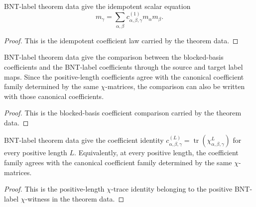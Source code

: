 \begin{theorem}%
    \label{thm:mpdo_bnt_label_theorem_data_idempotent_eq_sum}
    \leanok
    BNT-label theorem data give the idempotent scalar equation
    \[
        m_\gamma =
        \sum_{\alpha,\beta}
        c^{(1)}_{\alpha,\beta,\gamma}m_\alpha m_\beta.
    \]
\end{theorem}
\begin{proof}\leanok
    This is the idempotent coefficient law carried by the theorem data.
\end{proof}

\begin{theorem}%
    \label{thm:mpdo_bnt_label_theorem_data_blocked_coeff_eq}
    \leanok
    BNT-label theorem data give the comparison between the blocked-basis
    coefficients and the BNT-label coefficients through the source and target
    label maps. Since the positive-length coefficients agree with the
    canonical coefficient family determined by the same $\chi$-matrices, the
    comparison can also be written with those canonical coefficients.
\end{theorem}
\begin{proof}\leanok
    This is the blocked-basis coefficient comparison carried by the theorem
    data.
\end{proof}

\begin{theorem}%
    \label{thm:mpdo_bnt_label_theorem_data_coeff_eq_trace_pow}
    \leanok
    BNT-label theorem data give the coefficient identity
    $c^{(L)}_{\alpha,\beta,\gamma}
        = \operatorname{tr}(\chi_{\alpha,\beta,\gamma}^{L})$
    for every positive length $L$. Equivalently, at every positive length, the
    coefficient family agrees with the canonical coefficient family determined
    by the same $\chi$-matrices.
\end{theorem}
\begin{proof}\leanok
    This is the positive-length $\chi$-trace identity belonging to the
    positive BNT-label $\chi$-witness in the theorem data.
\end{proof}

